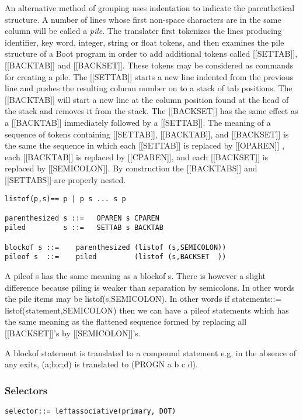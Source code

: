 \documentclass{article}
\begin{document}
An alternative method of grouping uses indentation to indicate the
parenthetical structure.
A number of lines whose first non-space characters are in the same
column will be called a \emph{pile}.  The translater first tokenizes the
lines producing identifier, key word, integer, string or float tokens,
and then examines the pile structure of a Boot program
in order to add additional tokens called [[SETTAB]], [[BACKTAB]] 
and [[BACKSET]].
These tokens may be considered as commands for creating a pile.
The [[SETTAB]] starts a new line indented from the previous line and
pushes the resulting column number on to a stack of tab positions.
The [[BACKTAB]] will start a new line at the column position found
at the head of the stack and removes it from the stack.
The [[BACKSET]] has the same effect as a [[BACKTAB]] immediately followed
by a [[SETTAB]].
The meaning of a sequence of tokens containing [[SETTAB]],
[[BACKTAB]], and [[BACKSET]] is the same the sequence in which each
[[SETTAB]] is replaced by [[OPAREN]] , each [[BACKTAB]] is replaced by
[[CPAREN]], and each [[BACKSET]] is replaced by [[SEMICOLON]]. By
construction the [[BACKTABS]] and [[SETTABS]] are properly nested.
\begin{verbatim}  
listof(p,s)== p | p s ... s p
 
parenthesized s ::=   OPAREN s CPAREN
piled         s ::=   SETTAB s BACKTAB
 
blockof s ::=    parenthesized (listof (s,SEMICOLON))
pileof s  ::=    piled         (listof (s,BACKSET  ))
\end{verbatim} 

A pileof s has the same meaning as a blockof s.
There is however a slight difference because piling is weaker than
separation by semicolons. In other words the pile items
may be listof(s,SEMICOLON).
In other words if statements::= listof(statement,SEMICOLON) then
we can have a pileof statements which has the same meaning as
the flattened sequence formed by replacing
all [[BACKSET]]'s by [[SEMICOLON]]'s.
 
A blockof statement is translated to a compound statement
e.g. in the absence of any exits,
(a;b;c;d) is translated to (PROGN a b c d).
 
\subsubsection{Selectors}
\label{sec:boot:selector}

\begin{verbatim}  
selector::= leftassociative(primary, DOT)
\end{verbatim} 
\end{document}
